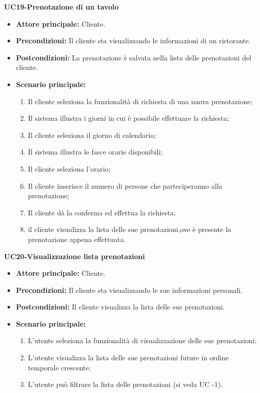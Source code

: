 \textbf{UC19-Prenotazione di un tavolo}
\begin{itemize}
    \item \textbf{Attore principale: }Cliente.
    \item \textbf{Precondizioni: }Il cliente sta visualizzando le informazioni di un ristorante.
    \item \textbf{Postcondizioni: }La prenotazione è salvata nella lista delle prenotazioni del cliente.
    \item \textbf{Scenario principale:} 
        \begin{enumerate}
            \item Il cliente seleziona la funzionalità di richiesta di una nuova prenotazione;
            \item Il sistema illustra i giorni in cui è possibile effettuare la richiesta;
            \item Il cliente seleziona il giorno di calendario;
            \item Il sistema illustra le fasce orarie disponibili;
            \item Il cliente seleziona l'orario;
            \item Il cliente inserisce il numero di persone che parteciperanno alla prenotazione;
            \item Il cliente dà la conferma ed effettua la richiesta;
            \item il cliente visualizza la lista delle sue prenotazioni,ove è presente la prenotazione appena
            effettuata.
        \end{enumerate}
\end{itemize}

\textbf{UC20-Visualizzazione lista prenotazioni}
\begin{itemize}
    \item \textbf{Attore principale: } Cliente.
    \item \textbf{Precondizioni: }Il cliente sta visualizzando le sue informazioni personali.
    \item \textbf{Postcondizioni: }Il cliente visualizza la lista delle sue prenotazioni.
    \item \textbf{Scenario principale:} 
        \begin{enumerate}
            \item L'utente seleziona la funzionalità di visualizzazione delle sue prenotazioni;
            \item L'utente visualizza la lista delle sue prenotazioni future in ordine temporale crescente;
            \item L'utente può filtrare la lista delle prenotazioni (si veda UC -1). %
        \end{enumerate}
\end{itemize}

